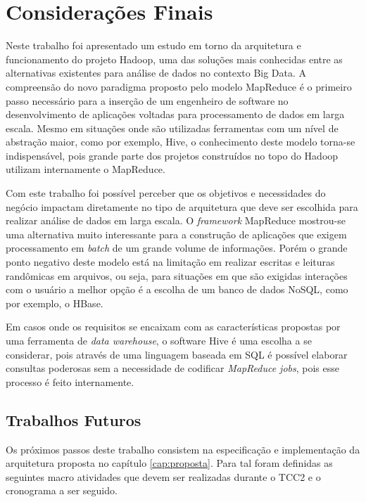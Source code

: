\chapter{Considerações Finais}
\label{cap:conclusao}

Neste trabalho foi apresentado um estudo em torno da arquitetura e funcionamento do projeto Hadoop, uma das soluções mais conhecidas entre as alternativas existentes para análise de dados no contexto Big Data. A compreensão do novo paradigma proposto pelo modelo MapReduce é o primeiro passo necessário para a inserção de um engenheiro de software no desenvolvimento de aplicações voltadas para processamento de dados em larga escala. Mesmo em situações onde são utilizadas ferramentas com um nível de abstração maior, como por exemplo, Hive, o conhecimento deste modelo torna-se indispensável, pois grande parte dos projetos construídos no topo do Hadoop utilizam internamente o MapReduce.

Com este trabalho foi possível perceber que os objetivos e necessidades do negócio impactam diretamente no tipo de arquitetura que deve ser escolhida para realizar análise de dados em larga escala. O \textit{framework} MapReduce mostrou-se uma alternativa muito interessante para a construção de aplicações que exigem processamento em \textit{batch} de um grande volume de informações. Porém o grande ponto negativo deste modelo está na limitação em realizar escritas e leituras randômicas em arquivos, ou seja, para situações em que são exigidas interações com o usuário a melhor opção é a escolha de um banco de dados NoSQL, como por exemplo, o HBase.

Em casos onde os requisitos se encaixam com as características propostas por uma ferramenta de \textit{data warehouse}, o software Hive é uma escolha a se considerar, pois através de uma linguagem baseada em SQL é possível elaborar consultas poderosas sem a necessidade de codificar \textit{MapReduce jobs}, pois esse processo é feito internamente.

\section{Trabalhos Futuros}

Os próximos passos deste trabalho consistem na especificação e implementação da arquitetura proposta no capítulo \ref{cap:proposta}. Para tal foram definidas as seguintes macro atividades que devem ser realizadas durante o TCC2 e o cronograma a ser seguido.

